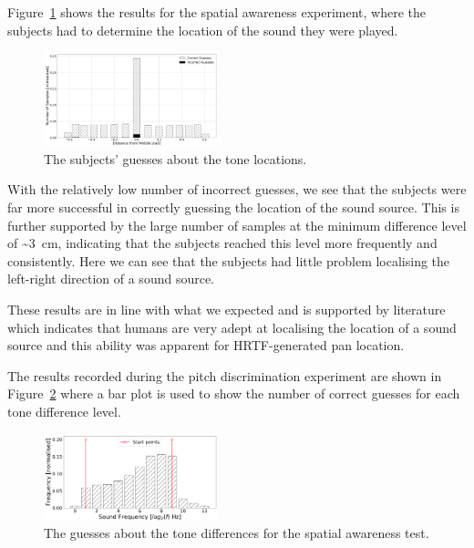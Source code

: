 \documentclass[format=sigconf, review=true, screen=true, anonymous=true]{acmart}
\begin{document}
Figure~\ref{fig:location-guesses} shows the results for the spatial awareness experiment, where the subjects had to determine the location of the sound they were played. 

\begin{figure}
  \centering
  \includegraphics[width=0.45\textwidth]{figures/location_guesses.png}
  \caption{The subjects' guesses about the tone locations.}
  \label{fig:location-guesses}
\end{figure}

With the relatively low number of incorrect guesses, we see that the subjects were far more successful in correctly guessing the location of the sound source. This is further supported by the large number of samples at the minimum difference level of \textasciitilde\SI{3}{\cm}, indicating that the subjects reached this level more frequently and consistently. Here we can see that the subjects had little problem localising the left-right direction of a sound source. 

These results are in line with what we expected and is supported by literature which indicates that humans are very adept at localising the location of a sound source and this ability was apparent for HRTF-generated pan location. 


The results recorded during the pitch discrimination experiment are shown in Figure~\ref{fig:tone-guesses} where a bar plot is used to show the number of correct guesses for each tone difference level. 

\begin{figure}
  \centering
  \includegraphics[width=0.45\textwidth]{figures/tone_guesses.png}
  \caption{The guesses about the tone differences for the spatial awareness test.}
  \label{fig:tone-guesses}
\end{figure}
\end{document}
